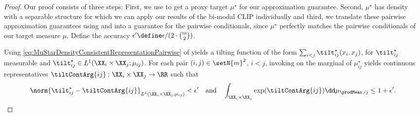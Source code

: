 \documentclass{article}
\begin{document}
\begin{proof}
 Our proof consists of three steps:  First, we use
  to get a proxy target
 $\mu^\star$ for our
 approximation guarantee. Second, $\mu^\star$ has density with a separable structure
 for which we can apply our results of the bi-modal CLIP individually and third,
 we translate these pairwise approximation guarantees using
  and
  into a guarantee for the pairwise
 conditionals, since $\mu^\star$ perfectly matches
 the pairwise conditionals of our target measure $\mu$. Define the accuracy
 $\epsilon^\prime \define \epsilon / (2 \cdot \binom{m}{2})$.

  Using
 \eqref{eq:MuStarDensityConsistentRepresentationPairwise} of
  yields a tilting function
 of the form $\sum_{i<j} \tilt^\star_{ij}(x_i, x_j)$, for $\tilt_{ij}^\star$
 measurable and $\tilt_{ij}^\star \in L^1(\XX_i \times \XX_j;\mu_{ij})$.
 For each pair $(i,j) \in \setN{m}^2$, $i < j$, invoking
  on the marginal of $\mu^\star_{ij}$
 yields continuous representatives
 $\tiltContArg{ij} : \XX_i \times \XX_j \to \RR$ such that
 \begin{align*}
  \norm{\tilt^\star_{ij} - \tiltContArg{ij}}_{L^1(\XX_i \times \XX_j; \mu_{ij})}
  < \epsilon^\prime
  \quad \text{and} \quad
  \int_{\XX_i \times \XX_j} \exp(\tiltContArg{ij}) \dd \mu_{\prodMeas, ij}
  \leq 1 + \epsilon^\prime.
 \end{align*}


\end{proof}
\end{document}
